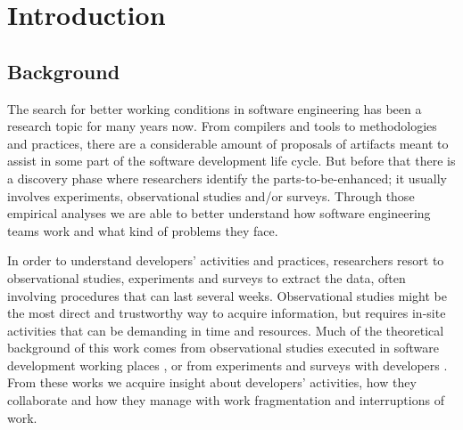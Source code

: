 \chapter{Introduction}

\section{Background}
The search for better working conditions in software engineering has been a research topic for many years now. From compilers and tools to methodologies and practices, there are a considerable amount of proposals of artifacts meant to assist in some part of the software development life cycle. But before that there is a discovery phase where researchers identify the parts-to-be-enhanced; it usually involves experiments, observational studies and/or surveys. Through those empirical analyses we are able to better understand how software engineering teams work and what kind of problems they face.


\begin{changedforreviewerlong}
In order to understand developers' activities and practices, researchers resort to observational studies, experiments and surveys to extract the data, often involving procedures that can last several weeks. Observational studies might be the most direct and trustworthy way to acquire information, but requires in-site activities that can be demanding in time and resources. Much of the theoretical background of this work comes from observational studies executed in software development working places \cite{KMC06, GM04}, or from experiments and surveys with developers \cite{LVD06, PR11}. From these works we acquire insight about developers' activities, how they collaborate and how they manage with work fragmentation and interruptions of work.
\end{changedforreviewerlong}

